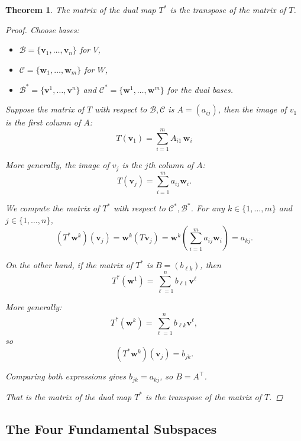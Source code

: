 \documentclass[11pt]{article}
\newtheorem{theorem}{Theorem}
\begin{document}
\begin{theorem}
The matrix of the dual map $ T^* $ is the transpose of the matrix of $ T $.
\begin{proof}
Choose bases:

\begin{itemize}
\item $ \mathcal{B} = \{ \mathbf{v}_1, \dots, \mathbf{v}_n \} $ for $ V $,
    \item $ \mathcal{C} = \{ \mathbf{w}_1, \dots, \mathbf{w}_m \} $ for $ W $,
    \item $ \mathcal{B}^* = \{ \mathbf{v}^1, \dots, \mathbf{v}^n \} $ and $ \mathcal{C}^* = \{ \mathbf{w}^1, \dots, \mathbf{w}^m \} $ for the dual bases.
\end{itemize}


Suppose the matrix of $ T $ with respect to $ \mathcal{B}, \mathcal{C} $ is $ A = (a_{ij})$, then the image of $v_1$ is the first column of $A$:
\[
T(\mathbf{v}_1) = \sum_{i=1}^{m} A_{i1} \, \mathbf{w}_i
\]

More generally, the image of $v_j$ is the $j$th column of $A$:
\[
T(\mathbf{v}_j) = \sum_{i=1}^m a_{ij} \mathbf{w}_i.
\]

We compute the matrix of $ T^* $ with respect to $ \mathcal{C}^*, \mathcal{B}^* $.  
For any $ k \in \{1, \dots, m\} $ and $ j \in \{1, \dots, n\} $,
\[
(T^* \mathbf{w}^k)(\mathbf{v}_j) = \mathbf{w}^k(T \mathbf{v}_j) = \mathbf{w}^k\left( \sum_{i=1}^m a_{ij} \mathbf{w}_i \right) = a_{kj}.
\]

On the other hand, if the matrix of $ T^* $ is $ B = (b_{\ell k}) $, then
\[
T^*(\mathbf{w}^1) = \sum_{\ell=1}^{n} b_{\ell 1} \, \mathbf{v}^\ell
\]


More generally:
\[
T^*(\mathbf{w}^k) = \sum_{\ell=1}^n b_{\ell k} \mathbf{v}^\ell,
\]
so
\[
(T^* \mathbf{w}^k)(\mathbf{v}_j) = b_{j k}.
\]

Comparing both expressions gives $ b_{j k} = a_{k j} $, so $ B = A^\top $.


That is the matrix of the dual map $ T^* $ is the transpose of the matrix of $ T $.
\end{proof}
\end{theorem}










\subsection{\Large The Four Fundamental Subspaces}
\end{document}

